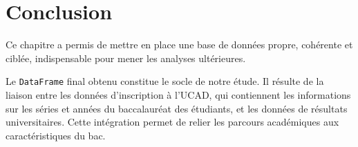 \section{Conclusion}

Ce chapitre a permis de mettre en place une base de données propre, cohérente et ciblée, indispensable pour mener les analyses ultérieures.

Le \texttt{DataFrame} final obtenu constitue le socle de notre étude. Il résulte de la liaison entre les données d’inscription à l’UCAD, qui contiennent les informations sur les séries et années du baccalauréat des étudiants, et les données de résultats universitaires.
Cette intégration permet de relier les parcours académiques aux caractéristiques du bac.